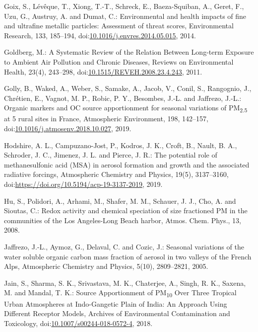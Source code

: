 \documentclass[
]{article}
\begin{document}
Goix, S., Lévêque, T., Xiong, T.-T., Schreck, E., Baeza-Squiban, A.,
Geret, F., Uzu, G., Austruy, A. and Dumat, C.: Environmental and health
impacts of fine and ultrafine metallic particles: Assessment of threat
scores, Environmental Research, 133, 185--194,
doi:\href{https://doi.org/10.1016/j.envres.2014.05.015}{10.1016/j.envres.2014.05.015},
2014.

Goldberg, M.: A Systematic Review of the Relation Between Long-term
Exposure to Ambient Air Pollution and Chronic Diseases, Reviews on
Environmental Health, 23(4), 243--298,
doi:\href{https://doi.org/10.1515/REVEH.2008.23.4.243}{10.1515/REVEH.2008.23.4.243},
2011.

Golly, B., Waked, A., Weber, S., Samake, A., Jacob, V., Conil, S.,
Rangognio, J., Chrétien, E., Vagnot, M. P., Robic, P. Y., Besombes,
J.-L. and Jaffrezo, J.-L.: Organic markers and OC source apportionment
for seasonal variations of PM\textsubscript{2.5} at 5 rural sites in
France, Atmospheric Environment, 198, 142--157,
doi:\href{https://doi.org/10.1016/j.atmosenv.2018.10.027}{10.1016/j.atmosenv.2018.10.027},
2019.

Hodshire, A. L., Campuzano-Jost, P., Kodros, J. K., Croft, B., Nault, B.
A., Schroder, J. C., Jimenez, J. L. and Pierce, J. R.: The potential
role of methanesulfonic acid (MSA) in aerosol formation and growth and
the associated radiative forcings, Atmospheric Chemistry and Physics,
19(5), 3137--3160,
doi:\href{https://doi.org/https://doi.org/10.5194/acp-19-3137-2019}{https://doi.org/10.5194/acp-19-3137-2019},
2019.

Hu, S., Polidori, A., Arhami, M., Shafer, M. M., Schauer, J. J., Cho, A.
and Sioutas, C.: Redox activity and chemical speciation of size
fractioned PM in the communities of the Los Angeles-Long Beach harbor,
Atmos. Chem. Phys., 13, 2008.

Jaffrezo, J.-L., Aymoz, G., Delaval, C. and Cozic, J.: Seasonal
variations of the water soluble organic carbon mass fraction of aerosol
in two valleys of the French Alps, Atmospheric Chemistry and Physics,
5(10), 2809--2821, 2005.

Jain, S., Sharma, S. K., Srivastava, M. K., Chaterjee, A., Singh, R. K.,
Saxena, M. and Mandal, T. K.: Source Apportionment of
PM\textsubscript{10} Over Three Tropical Urban Atmospheres at
Indo-Gangetic Plain of India: An Approach Using Different Receptor
Models, Archives of Environmental Contamination and Toxicology,
doi:\href{https://doi.org/10.1007/s00244-018-0572-4}{10.1007/s00244-018-0572-4},
2018.
\end{document}
